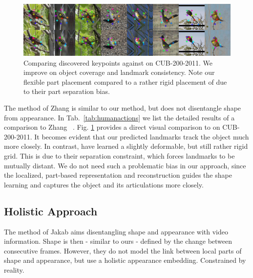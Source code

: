 			\begin{figure}[htp]
				\centering
				\includegraphics[trim={0cm 0cm 0cm 0cm},clip, width=1.\linewidth]{fig/shape/comp}
				\caption{Comparing discovered keypoints against \cite{zhang18} on CUB-200-2011. We improve on object coverage and landmark consistency. Note our flexible part placement compared to a rather rigid placement of \cite{zhang18} due to their part separation bias.}
				\label{fig:compare}
			\end{figure}

			The method of Zhang \etal \cite{zhang18} is similar to our method, but does not disentangle shape from appearance.
			In Tab.~\ref{tab:humanactions} we list the detailed results of a comparison to Zhang \etal~\cite{zhang18}.
			Fig. \ref{fig:compare} provides a direct visual comparison to \cite{zhang18} on CUB-200-2011.
			It becomes evident that our predicted landmarks track the object much more closely.
			In contrast, \cite{zhang18} have learned a slightly deformable, but still rather rigid grid.
			This is due to their separation constraint, which forces landmarks to be mutually distant.
			We do not need such a problematic bias in our approach, since the localized, part-based representation and reconstruction guides the shape learning and captures the object and its articulations more closely.

		\subsection{Holistic Approach}

			The method of Jakab \etal \cite{jakab18} aims disentangling shape and appearance with video information. Shape is then - similar to ours - defined by the change between consecutive frames. However, they do not model the link between local parts of shape and appearance, but use a holistic appearance embedding. Constrained by reality.

